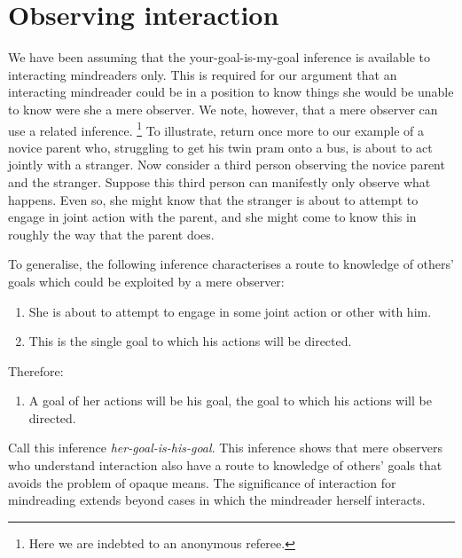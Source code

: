 \documentclass[12pt,\papersize]{extarticle}
\begin{document}
\section{Observing interaction}
\label{sec:observing_joint_action}
We have been assuming that the your-goal-is-my-goal inference is  available to interacting mindreaders only. 
This is required for our argument that 
an interacting mindreader could be in a position to know things  she would be unable to know were she a mere observer.
We note, however, that a mere observer can use a related inference.%
\footnote{
Here we are  indebted to an anonymous referee.
} 
To illustrate, return once more to our example of a novice parent who, struggling to get his twin pram onto a bus, is about to act jointly with a stranger.
Now consider a third person observing the novice parent and the stranger. 
Suppose this third person can manifestly only observe what  happens. 
Even so, she might know that the stranger is about to attempt to engage in joint action with the parent, and she might come to know this in roughly the way that the parent does. 

To generalise, the following inference characterises a route to knowledge of others' goals which could be exploited by a mere observer:
\begin{enumerate}
\item She is about to attempt to engage in some joint action or other with him.

\item This is the single goal to which his actions will be directed.

\end{enumerate}
%
Therefore:
%
\begin{enumerate}[resume]
%
\item A goal of her actions will be his goal, the goal to which his actions will be directed.
\end{enumerate}
%
Call this inference \emph{her-goal-is-his-goal}.  
This inference shows that mere observers who understand interaction also have a route to knowledge of others' goals that avoids the problem of opaque means. 
The significance of interaction for mindreading extends beyond cases in which the mindreader herself interacts.
\end{document}
